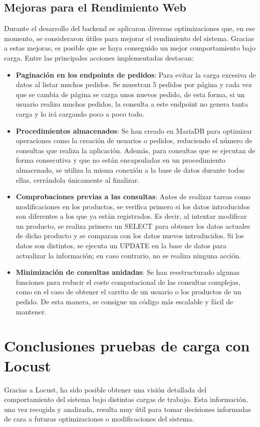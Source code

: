 \documentclass[10pt]{book}
\begin{document}
\subsection{Mejoras para el Rendimiento Web}
Durante el desarrollo del backend se aplicaron diversas optimizaciones que, en ese momento, se consideraron útiles para mejorar el rendimiento del sistema. Gracias a estas mejoras, es posible que se haya conseguido un mejor comportamiento bajo carga. Entre las principales acciones implementadas destacan:

\begin{itemize}
    \item \textbf{Paginación en los endpoints de pedidos}: Para evitar la carga excesiva de datos al listar muchos pedidos. Se muestran 5 pedidos por página y cada vez que se cambia de página se carga unos nuevos pedido, de esta forma, si un usuario realiza muchos pedidos, la consulta a este endpoint no genera tanta carga y lo irá cargando poco a poco todo.
    \item \textbf{Procedimientos almacenados}: Se han creado en MariaDB para optimizar operaciones como la creación de usuarios o pedidos, reduciendo el número de consultas que realiza la aplicación. Además, para consultas que se ejecutan de forma consecutiva y que no están encapsuladas en un procedimiento almacenado, se utiliza la misma conexión a la base de datos durante todas ellas, cerrándola únicamente al finalizar.
    \item \textbf{Comprobaciones previas a las consultas}: Antes de realizar tareas como modificaciones en los productos, se verifica primero si los datos introducidos son diferentes a los que ya están registrados. Es decir, al intentar modificar un producto, se realiza primero un SELECT para obtener los datos actuales de dicho producto y se comparan con los datos nuevos introducidos. Si los datos son distintos, se ejecuta un UPDATE en la base de datos para actualizar la información; en caso contrario, no se realiza ninguna acción.
    \item \textbf{Minimización de consultas anidadas}: Se han reestructurado algunas funciones para reducir el coste computacional de las consultas complejas, como en el caso de obtener el carrito de un usuario o los productos de un pedido. De esta manera, se consigue un código más escalable y fácil de mantener.
\end{itemize}


\section{Conclusiones pruebas de carga con Locust}
Gracias a Locust, ha sido posible obtener una visión detallada del comportamiento del sistema bajo distintas cargas de trabajo. Esta información, una vez recogida y analizada, resulta muy útil para tomar decisiones informadas de cara a futuras optimizaciones o modificaciones del sistema.\\
\end{document}
